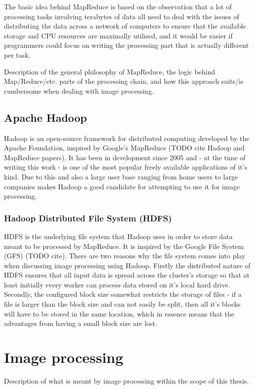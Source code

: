 \documentclass [12pt,a4paper]{report}
\begin{document}
The basic idea behind MapReduce is based on the observation that a lot of processing tasks involving terabytes of data all need to deal with the issues of distributing the data across a network of computers to ensure that the available storage and CPU resources are maximally utilised, and it would be easier if programmers could focus on writing the processing part that is actually different per task.
 
Description of the general philosophy of MapReduce, the logic behind Map/Reduce/etc. parts of the processing chain, and how this approach suits/is cumbersome when dealing with image processing.

\subsection{Apache Hadoop}
Hadoop is an open-source framework for distributed computing developed by the Apache Foundation, inspired by Google's MapReduce (TODO cite Hadoop and MapReduce papers). It has been in development since 2005 and - at the time of writing this work - is one of the most popular freely available applications of it's kind. Due to this and also a large user base ranging from home users to large companies makes Hadoop a good candidate for attempting to use it for image processing.

\subsubsection{Hadoop Distributed File System (HDFS)}
HDFS is the underlying file system that Hadoop uses in order to store data meant to be processed by MapReduce. It is inspired by the Google File System (GFS) (TODO cite). There are two reasons why the file system comes into play when discussing image processing using Hadoop. Firstly the distributed nature of HDFS ensures that all input data is spread across the cluster's storage so that at least initially every worker can process data stored on it's local hard drive. Secondly, the configured block size somewhat restricts the storage of files - if a file is larger than the block size and can not easily be split, then all it's blocks will have to be stored in the same location, which in essence means that the advantages from having a small block size are lost.

\section{Image processing}
Description of what is meant by image processing within the scope of this thesis.
\end{document}

